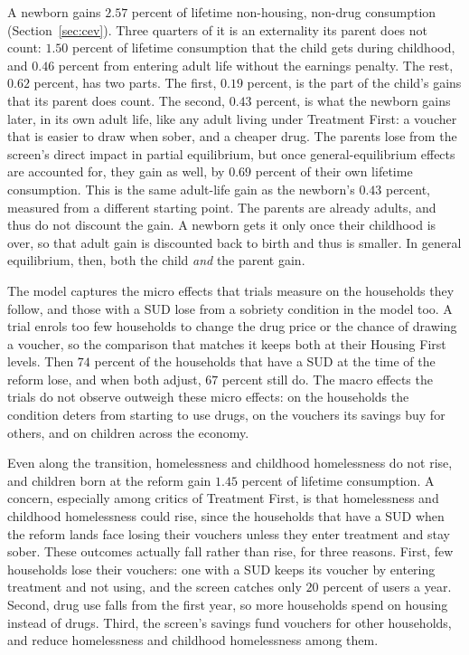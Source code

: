 \documentclass[10pt]{article}
\newif\ifshowupdates \showupdatesfalse
\newcommand{\updnum}[1]{\ifshowupdates{\color{blue}#1}\else#1\fi}
\begin{document}
A newborn gains $2.57$ percent of lifetime non-housing, non-drug consumption (Section~\ref{sec:cev}). Three quarters of it is an externality its parent does not count: $1.50$ percent of lifetime consumption that the child gets during childhood, and $0.46$ percent from entering adult life without the earnings penalty. The rest, $0.62$ percent, has two parts. The first, $0.19$ percent, is the part of the child's gains that its parent does count. The second, $0.43$ percent, is what the newborn gains later, in its own adult life, like any adult living under Treatment First: a voucher that is easier to draw when sober, and a cheaper drug. The parents lose from the screen's direct impact in partial equilibrium, but once general-equilibrium effects are accounted for, they gain as well, by $0.69$ percent of their own lifetime consumption. This is the same adult-life gain as the newborn's $0.43$ percent, measured from a different starting point.   The parents are already adults, and thus do not discount the gain. A newborn gets it only once their childhood is over, so that adult gain is discounted back to birth and thus is smaller. In general equilibrium, then, both the child \emph{and} the parent gain.

The model captures the micro effects that trials measure on the households they follow, and those with a SUD lose from a sobriety condition in the model too. A trial enrols too few households to change the drug price or the chance of drawing a voucher, so the comparison that matches it keeps both at their Housing First levels. Then $74$ percent of the households that have a SUD at the time of the reform lose, and when both adjust, \updnum{$67$} percent still do. The macro effects the trials do not observe outweigh these micro effects: on the households the condition deters from starting to use drugs, on the vouchers its savings buy for others, and on children across the economy.

Even along the transition, homelessness and childhood homelessness do not rise, and children born at the reform gain \updnum{$1.45$} percent of lifetime consumption. A concern, especially among critics of Treatment First, is that homelessness and childhood homelessness could rise, since the households that have a SUD when the reform lands face losing their vouchers unless they enter treatment and stay sober. These outcomes actually fall rather than rise, for three reasons. First, few households lose their vouchers: one with a SUD keeps its voucher by entering treatment and not using, and the screen catches only $20$ percent of users a year. Second, drug use falls from the first year, so more households spend on housing instead of drugs. Third, the screen's savings fund vouchers for other households, and reduce homelessness and childhood homelessness among them.
\end{document}
